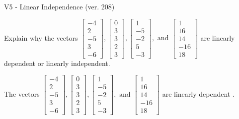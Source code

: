 \begin{exercise}
  \begin{exerciseTitle}V5 - Linear Independence (ver. 208)\end{exerciseTitle}
  \begin{exerciseStatement}
    Explain why the vectors \(\left[\begin{array}{r}
-4 \\
2 \\
-5 \\
3 \\
-6
\end{array}\right] , \left[\begin{array}{r}
0 \\
3 \\
3 \\
2 \\
3
\end{array}\right] , \left[\begin{array}{r}
1 \\
-5 \\
-2 \\
5 \\
-3
\end{array}\right] , \text{ and } \left[\begin{array}{r}
1 \\
16 \\
14 \\
-16 \\
18
\end{array}\right]\) are linearly dependent or linearly independent.	


  \end{exerciseStatement}
  \begin{exerciseAnswer}
   The vectors \(\left[\begin{array}{r}
-4 \\
2 \\
-5 \\
3 \\
-6
\end{array}\right] , \left[\begin{array}{r}
0 \\
3 \\
3 \\
2 \\
3
\end{array}\right] , \left[\begin{array}{r}
1 \\
-5 \\
-2 \\
5 \\
-3
\end{array}\right] , \text{ and } \left[\begin{array}{r}
1 \\
16 \\
14 \\
-16 \\
18
\end{array}\right]\) are 
  	 linearly dependent  .
  


  \end{exerciseAnswer}
\end{exercise}